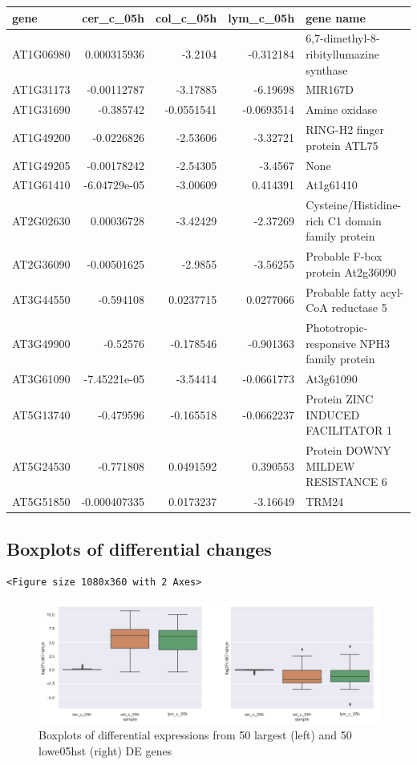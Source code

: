 \documentclass[11pt]{article}
\begin{document}
\begin{center}
\begin{tabular}{lrrrl}
gene & cer\_c\_05h & col\_c\_05h & lym\_c\_05h & gene name\\
\hline
AT1G06980 & 0.000315936 & -3.2104 & -0.312184 & 6,7-dimethyl-8-ribityllumazine synthase\\
AT1G31173 & -0.00112787 & -3.17885 & -6.19698 & MIR167D\\
AT1G31690 & -0.385742 & -0.0551541 & -0.0693514 & Amine oxidase\\
AT1G49200 & -0.0226826 & -2.53606 & -3.32721 & RING-H2 finger protein ATL75\\
AT1G49205 & -0.00178242 & -2.54305 & -3.4567 & None\\
AT1G61410 & -6.04729e-05 & -3.00609 & 0.414391 & At1g61410\\
AT2G02630 & 0.00036728 & -3.42429 & -2.37269 & Cysteine/Histidine-rich C1 domain family protein\\
AT2G36090 & -0.00501625 & -2.9855 & -3.56255 & Probable F-box protein At2g36090\\
AT3G44550 & -0.594108 & 0.0237715 & 0.0277066 & Probable fatty acyl-CoA reductase 5\\
AT3G49900 & -0.52576 & -0.178546 & -0.901363 & Phototropic-responsive NPH3 family protein\\
AT3G61090 & -7.45221e-05 & -3.54414 & -0.0661773 & At3g61090\\
AT5G13740 & -0.479596 & -0.165518 & -0.0662237 & Protein ZINC INDUCED FACILITATOR 1\\
AT5G24530 & -0.771808 & 0.0491592 & 0.390553 & Protein DOWNY MILDEW RESISTANCE 6\\
AT5G51850 & -0.000407335 & 0.0173237 & -3.16649 & TRM24\\
\end{tabular}
\end{center}




\subsection{Boxplots of differential changes}
\label{sec:org9e636c2}

\begin{verbatim}
<Figure size 1080x360 with 2 Axes>
\end{verbatim}


\begin{figure}[htbp]
\centering
\includegraphics[width=.9\linewidth]{obipy-resources/pairings_05hr_boxplots.png}
\caption{\label{pairings_05hr_boxplots}
Boxplots of differential expressions from 50 largest (left) and 50 lowe05hst (right) DE genes}
\end{figure}
\end{document}

